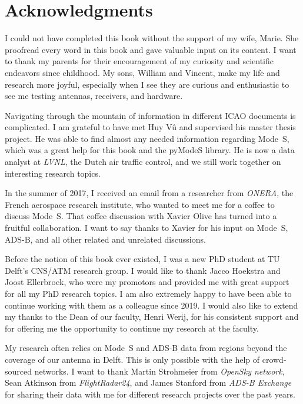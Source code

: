\chapter*{Acknowledgments}

\vspace{-0.3cm}

{
I could not have completed this book without the support of my wife, Marie. She proofread every word in this book and gave valuable input on its content. I want to thank my parents for their encouragement of my curiosity and scientific endeavors since childhood. My sons, William and Vincent, make my life and research more joyful, especially when I see they are curious and enthusiastic to see me testing antennas, receivers, and hardware.

Navigating through the mountain of information in different ICAO documents is complicated. I am grateful to have met Huy V\^u and supervised his master thesis project. He was able to find almost any needed information regarding Mode~S, which was a great help for this book and the pyModeS library. He is now a data analyst at \emph{LVNL}, the Dutch air traffic control, and we still work together on interesting research topics. 

In the summer of 2017, I received an email from a researcher from \emph{ONERA}, the French aerospace research institute, who wanted to meet me for a coffee to discuss Mode~S. That coffee discussion with Xavier Olive has turned into a fruitful collaboration. I want to say thanks to Xavier for his input on Mode~S, ADS-B, and all other related and unrelated discussions.

Before the notion of this book ever existed, I was a new PhD student at TU Delft's CNS/ATM research group. I would like to thank Jacco Hoekstra and Joost Ellerbroek, who were my promotors and provided me with great support for all my PhD research topics. I am also extremely happy to have been able to continue working with them as a colleague since 2019. I would also like to extend my thanks to the Dean of our faculty, Henri Werij, for his consistent support and for offering me the opportunity to continue my research at the faculty. 

My research often relies on Mode~S and ADS-B data from regions beyond the coverage of our antenna in Delft. This is only possible with the help of crowd-sourced networks. I want to thank Martin Strohmeier from \emph{OpenSky network}, Sean Atkinson from \emph{FlightRadar24}, and James Stanford from \emph{ADS-B Exchange} for sharing their data with me for different research projects over the past years.

}
